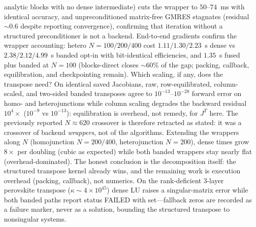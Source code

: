 analytic blocks with no dense intermediate) cuts the wrapper to
$50$--$74$~ms with identical accuracy, and unpreconditioned matrix-free
GMRES stagnates (residual $\sim$0.6 despite reporting convergence),
confirming that iteration without a structured preconditioner is not a
backend. End-to-end gradients confirm the wrapper accounting: hetero
$N=100/200/400$ cost $1.11/1.30/2.23$~s dense vs $2.38/2.12/4.99$~s
banded opt-in with bit-identical efficiencies, and $1.35$~s fused plus
banded at $N=100$ (blocks-direct closes $\sim$60\% of the gap; packing,
callback, equilibration, and checkpointing remain). Which scaling, if
any, does the transpose need? On identical saved Jacobians, raw,
row-equilibrated, column-scaled, and two-sided banded transposes agree
to $10^{-13}$--$10^{-28}$ forward error on homo- and heterojunctions
while column scaling degrades the backward residual $10^4\times$
($10^{-9}$ vs $10^{-13}$): equilibration is overhead, not remedy, for
$J^T$ here. The previously reported $N\approx620$
crossover is therefore retracted as stated: it was a crossover of backend
\emph{wrappers}, not of the algorithms. Extending the wrappers along $N$
(homojunction $N=200/400$, heterojunction $N=200$), dense times grow
$8\times$ per doubling (cubic as expected) while both banded wrappers
stay nearly flat (overhead-dominated). The honest conclusion is the
decomposition itself: the structured transpose kernel already wins, and
the remaining work is execution overhead (packing, callback), not
numerics. On the rank-deficient 3-layer perovskite transpose
($\kappa\sim4\times10^{45}$) dense LU raises a singular-matrix error
while both banded paths report status FAILED with 
set---fallback zeros are recorded as a failure marker, never as a
solution, bounding the structured transpose to nonsingular systems.

